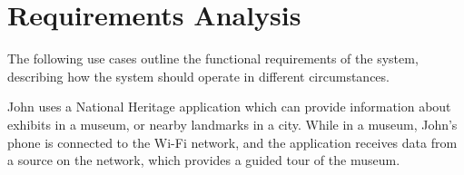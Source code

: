 \documentclass[12pt,twoside,notitlepage]{report}
\begin{document}

\section{Requirements Analysis}

The following use cases outline the functional requirements of the system, describing how the system should operate in different circumstances.

John uses a National Heritage application which can provide information about exhibits in a museum, or nearby landmarks in a city. 
While in a museum, John's phone is connected to the Wi-Fi network, and the application receives data from a source on the network, which provides a guided tour of the museum. 
\end{document}
